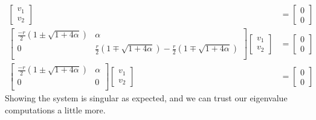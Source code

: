 \documentclass{article}
\begin{document}
\begin{align*}
\begin{bmatrix}
v_{1}\\
v_{2}
\end{bmatrix}
&=
\begin{bmatrix}
0\\
0
\end{bmatrix}
\\
\begin{bmatrix}
\frac{-r}{2}\left( 1 \pm \sqrt{1 + 4\alpha} \right)	&	\alpha		\\
0	&	\frac{r}{2}\left( 1 \mp \sqrt{1 + 4\alpha} \right) - \frac{r}{2} \left( 1 \mp \sqrt{1 + 4\alpha} \right)\\
\end{bmatrix}
\begin{bmatrix}
v_{1}\\
v_{2}
\end{bmatrix}
&=
\begin{bmatrix}
0\\
0
\end{bmatrix}
\\
\begin{bmatrix}
\frac{-r}{2}\left( 1 \pm \sqrt{1 + 4\alpha} \right)	&	\alpha		\\
0	&		0\\
\end{bmatrix}
\begin{bmatrix}
v_{1}\\
v_{2}
\end{bmatrix}
&=
\begin{bmatrix}
0\\
0
\end{bmatrix}
\end{align*}
Showing the system is singular as expected, and we can trust our eigenvalue computations a little more.
\end{document}
